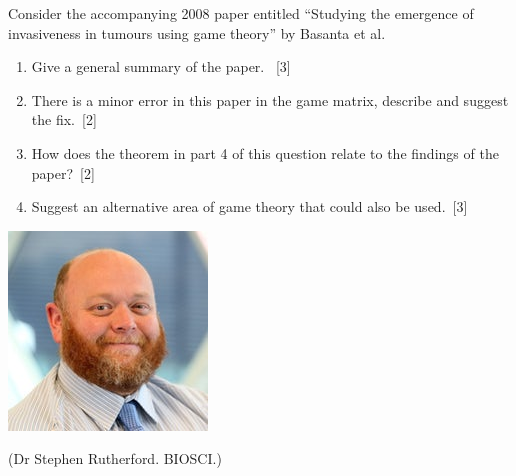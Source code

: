 \documentclass{beamer}
\begin{document}
    \begin{frame}
        Consider the accompanying 2008 paper entitled ``Studying the
		emergence of invasiveness in tumours using game theory'' by Basanta
		et al.
             \begin{enumerate}
                 \item Give a general summary of the paper.
                     ~\hfill{[3]}
                 \item There is a minor error in this paper in the game matrix, 
                     describe and suggest the fix.~\hfill{[2]}
                 \item How does the theorem in part 4 of this question relate to
                     the findings of the paper?~\hfill{[2]}
                 \item Suggest an alternative area of game theory that could
                     also be used.~\hfill{[3]}
             \end{enumerate}
    \end{frame}

    \begin{frame}
        \begin{center}
            \includegraphics[width=.5\textwidth]{./static/Rutherford_Stephen_staff_profile.jpg}

            (Dr Stephen Rutherford. BIOSCI.)
        \end{center}
    \end{frame}
\end{document}
